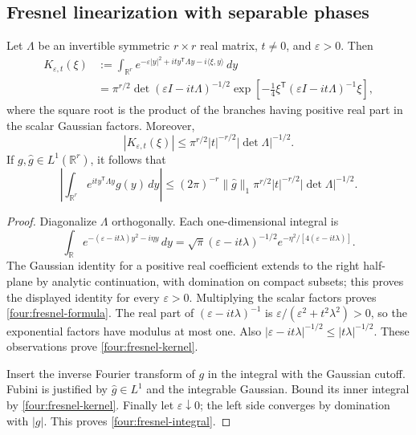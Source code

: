 \subsection{Fresnel linearization with separable phases}

\begin{lemma}\label{four:fresnel}
Let \(\Lambda\) be an invertible symmetric \(r\times r\) real matrix,
\(t\ne0\), and \(\varepsilon>0\).  Then
\begin{align}
 K_{\varepsilon,t}(\xi)
 &:=\int_{\mathbb R^r}
  e^{-\varepsilon|y|^2+it y^{\mathsf T}\Lambda y-i\langle\xi,y\rangle}\,dy
 \nonumber\\
 &=\pi^{r/2}\det(\varepsilon I-it\Lambda)^{-1/2}
       \exp\left[-\frac14
             \xi^{\mathsf T}(\varepsilon I-it\Lambda)^{-1}\xi\right],
 \label{four:fresnel-formula}
\end{align}
where the square root is the product of the branches having positive
real part in the scalar Gaussian factors.  Moreover,
\begin{equation}\label{four:fresnel-kernel}
 |K_{\varepsilon,t}(\xi)|
 \leq\pi^{r/2}|t|^{-r/2}|\det\Lambda|^{-1/2}.
\end{equation}
If \(g,\widehat g\in L^1(\mathbb R^r)\), it follows that
\begin{equation}\label{four:fresnel-integral}
 \left|\int_{\mathbb R^r}e^{it y^{\mathsf T}\Lambda y}g(y)\,dy\right|
 \leq(2\pi)^{-r}\|\widehat g\|_1
       \pi^{r/2}|t|^{-r/2}|\det\Lambda|^{-1/2}.
\end{equation}
\end{lemma}
\begin{proof}
Diagonalize \(\Lambda\) orthogonally.  Each one-dimensional integral
is
\[
 \int_{\mathbb R}e^{-(\varepsilon-it\lambda)y^2-i\eta y}\,dy
 =\sqrt\pi(\varepsilon-it\lambda)^{-1/2}
          e^{-\eta^2/[4(\varepsilon-it\lambda)]}.
\]
The Gaussian identity for a positive real coefficient extends to the
right half-plane by analytic continuation, with domination on compact
subsets; this proves the displayed identity for every \(\varepsilon>0\).
Multiplying the scalar factors proves \eqref{four:fresnel-formula}.
The real part of \((\varepsilon-it\lambda)^{-1}\) is
\(\varepsilon/(\varepsilon^2+t^2\lambda^2)>0\), so the exponential
factors have modulus at most one.  Also
\(|\varepsilon-it\lambda|^{-1/2}\leq|t\lambda|^{-1/2}\).
These observations prove \eqref{four:fresnel-kernel}.

Insert the inverse Fourier transform of \(g\) in the integral with
the Gaussian cutoff.  Fubini is justified by
\(\widehat g\in L^1\) and the integrable Gaussian.  Bound its inner
integral by \eqref{four:fresnel-kernel}.  Finally let
\(\varepsilon\downarrow0\); the left side converges by domination
with \(|g|\).  This proves \eqref{four:fresnel-integral}.
\end{proof}

